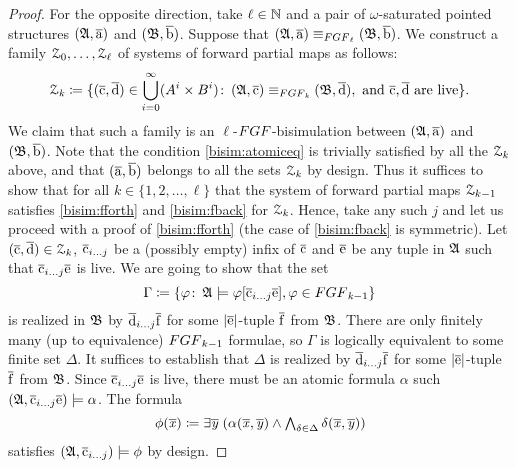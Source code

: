 \begin{proof}
For the opposite direction, take $\ell \in {\mathbb{N}}$ and a pair of $\omega$-saturated pointed structures $({\mathfrak{A}}, \overline{\mathrm{a}})$ and $({\mathfrak{B}}, \overline{\mathrm{b}})$.
Suppose that $(\str{A}, \elemtuplea) \equiv_{\FGF_\ell} (\str{B}, \elemtupleb)$.
We construct a family $\mathcal{Z}_0, \ldots, \mathcal{Z}_\ell$ of systems of forward partial maps as follows:
\[
	\bisimZ_{\mathit{k}} \coloneqq \{ (\elemtuplec, \elemtupled) \in \bigcup_{i=0}^{\infty} (A^i \times B^i) \colon\,  (\str{A}, \elemtuplec) \equiv_{\FGF_{\mathit{k}}} (\str{B}, \elemtupled), \ \text{and} \ \elemtuplec, \elemtupled \ \text{are live} \}.
\]
We claim that such a family is an $\ell$-$\FGF$-bisimulation between $({\mathfrak{A}}, \overline{\mathrm{a}})$ and $({\mathfrak{B}}, \overline{\mathrm{b}})$.
	Note that the condition \ref{bisim:atomiceq} is trivially satisfied by all the $\mathcal{Z}_{\mathit{k}}$ above, and that $(\overline{\mathrm{a}}, \overline{\mathrm{b}})$ belongs to all the sets $\mathcal{Z}_{\mathit{k}}$ by design.
Thus it suffices to show that for all $\mathit{k} \in \{ 1, 2, \ldots, \ell\}$ that the system of forward partial
maps $\mathcal{Z}_{k-1}$ satisfies \ref{bisim:fforth} and \ref{bisim:fback} for $\mathcal{Z}_{\mathit{k}}$.
Hence, take any such $j$ and let us proceed with a proof of \ref{bisim:fforth} (the case of \ref{bisim:fback} is symmetric).
	Let $(\overline{\mathrm{c}}, \overline{\mathrm{d}}) \in \mathcal{Z}_{\mathit{k}}$, $\overline{\mathrm{c}}_{i\ldots j}$ be a (possibly empty) infix of $\overline{\mathrm{c}}$
and $\overline{\mathrm{e}}$ be any tuple in ${\mathfrak{A}}$ such that $\overline{\mathrm{c}}_{i\ldots j}\overline{\mathrm{e}}$ is live.
We are going to show that the set
\[
  \Gamma \deff \{ \varphi \colon\, \str{A} \models \varphi[\elemtuplecfromto{i}{j}\elemtuplee], \varphi \in \FGF_{\mathit{k}{-}1} \}
\]
is realized in ${\mathfrak{B}}$ by $\overline{\mathrm{d}}_{i\ldots j}\overline{\mathrm{f}}$ for some $|\overline{\mathrm{e}}|$-tuple $\overline{\mathrm{f}}$ from ${\mathfrak{B}}$.
There are only finitely many (up to equivalence) $\FGF_{k{-}1}$ formulae, so $\Gamma$ is logically equivalent to some finite set $\Delta$.
It suffices to establish that $\Delta$ is realized by $\overline{\mathrm{d}}_{i\ldots j}\overline{\mathrm{f}}$ for some $|\overline{\mathrm{e}}|$-tuple $\overline{\mathrm{f}}$ from ${\mathfrak{B}}$.
Since $\overline{\mathrm{c}}_{i\ldots j}\overline{\mathrm{e}}$ is live, there must be an atomic formula $\alpha$ such $({\mathfrak{A}}, \overline{\mathrm{c}}_{i\ldots j}\overline{\mathrm{e}}) \models \alpha$.
The formula
\begin{equation*}
  \phi(\overline{\mathit{x}}) \coloneqq \exists{\overline{\mathit{y}}} \; (\alpha(\overline{\mathit{x}}, \overline{\mathit{y}}) \wedge \textstyle\bigwedge_{\delta \in \Delta} \delta(\overline{\mathit{x}}, \overline{\mathit{y}}))
\end{equation*}
satisfies $({\mathfrak{A}}, \overline{\mathrm{c}}_{i\ldots j}) \models \phi$ by design.

\end{proof}
